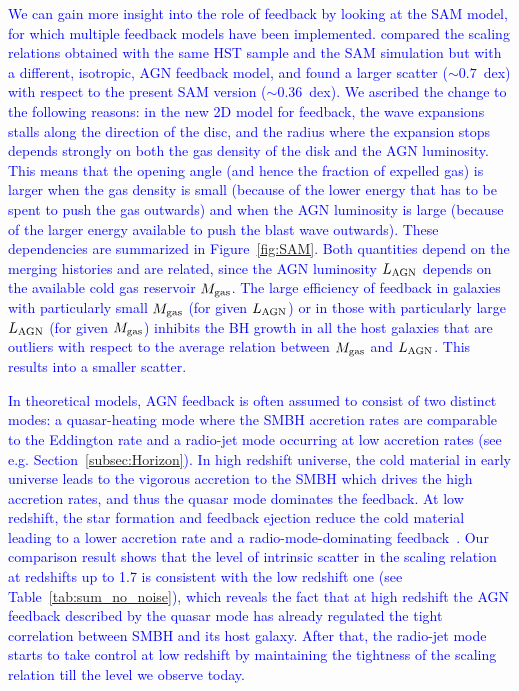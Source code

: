 \documentclass[twocolumn]{aastex631}
\newcommand{\blue}[1]{\textcolor{blue}{#1}}
\begin{document}
\blue{
We can gain more insight into the role of feedback by looking at the SAM model, for which multiple feedback models have been implemented. \citet{Ding2020b} compared the scaling relations obtained with the same HST sample and the SAM simulation but with a different, isotropic, AGN feedback model, and found a larger scatter ($\sim0.7$~dex) with respect to the present SAM version ($\sim0.36$~dex). We ascribed the change to the following reasons: in the new 2D model for feedback, the wave expansions stalls along the direction of the disc, and the radius where the expansion stops depends strongly on both the gas density of the disk and the AGN luminosity. 
This means that the opening angle (and hence the fraction of expelled gas) is larger when the gas density is small (because of the lower energy that has to be spent to push the gas outwards) and when the AGN luminosity is large (because of the larger energy available to push the blast wave outwards). These dependencies are summarized in Figure~\ref{fig:SAM}. 
Both quantities depend on the merging histories and are  related, since the AGN luminosity $L_{\rm AGN}$ depends on the available cold gas reservoir $M_{\rm gas}$.
The large efficiency of feedback in galaxies with particularly small $M_{\rm gas}$ (for given $L_{\rm AGN}$) or in those with particularly large $L_{\rm AGN}$
(for given $M_{\rm gas}$) inhibits the BH growth in all the host galaxies that are outliers with respect to the average relation between $M_{\rm gas}$ and $L_{\rm AGN}$. 
This results into a smaller scatter.}

\blue{
In theoretical models, AGN feedback is often assumed to consist of two distinct modes:
a quasar-heating mode where the SMBH accretion rates are comparable to the Eddington rate and a radio-jet mode occurring at low accretion rates (see e.g. Section~\ref{subsec:Horizon}). In high redshift universe, the cold material in early universe leads to the vigorous accretion to the SMBH which drives the high accretion rates, and thus the quasar mode dominates the feedback. At low redshift, the star formation and feedback ejection reduce the cold material leading to a lower accretion rate and a radio-mode-dominating feedback~\citep[e.g.][]{2012MNRAS.420.2662D,2016MNRAS.460.2979V,2018MNRAS.479.4056W}. Our comparison result shows that the level of intrinsic scatter in the scaling relation at redshifts up to 1.7 is consistent with the low redshift one (see Table~\ref{tab:sum_no_noise}), which reveals the fact that at high redshift the AGN feedback described by the quasar mode has already regulated the tight correlation between SMBH and its host galaxy. After that, the radio-jet mode starts to take control at low redshift by maintaining the tightness of the scaling relation till the level we observe today.
}
\end{document}
